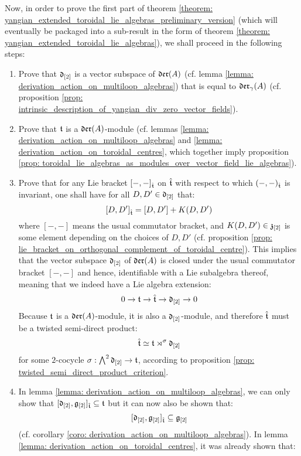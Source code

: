        Now, in order to prove the first part of theorem \ref{theorem: yangian_extended_toroidal_lie_algebras_preliminary_version} (which will eventually be packaged into a sub-result in the form of theorem \ref{theorem: yangian_extended_toroidal_lie_algebras}), we shall proceed in the following steps:
        \begin{enumerate}
            \item Prove that $\mathfrak{d}_{[2]}$ is a vector subspace of $\mathfrak{der}(A)$ (cf. lemma \ref{lemma: derivation_action_on_multiloop_algebras}) that is equal to $\mathfrak{der}_{\gamma}(A)$ (cf. proposition \ref{prop: intrinsic_description_of_yangian_div_zero_vector_fields}).
            \item Prove that $\mathfrak{t}$ is a $\mathfrak{der}(A)$-module (cf. lemmas \ref{lemma: derivation_action_on_multiloop_algebras} and \ref{lemma: derivation_action_on_toroidal_centres}, which together imply proposition \ref{prop: toroidal_lie_algebras_as_modules_over_vector_field_lie_algebras}).
            \item Prove that for any Lie bracket $[-, -]_{\hat{\mathfrak{t}}}$ on $\hat{\mathfrak{t}}$ with respect to which $(-, -)_{\hat{\mathfrak{t}}}$ is invariant, one shall have for all $D, D' \in \mathfrak{d}_{[2]}$ that:
                $$[D, D']_{\hat{\mathfrak{t}}} = [D, D'] + K(D, D')$$
            where $[-, -]$ means the usual commutator bracket, and $K(D, D') \in \mathfrak{z}_{[2]}$ is some element depending on the choices of $D, D'$ (cf. proposition \ref{prop: lie_bracket_on_orthogonal_complement_of_toroidal_centre}). This implies that the vector subspace $\mathfrak{d}_{[2]}$ of $\mathfrak{der}(A)$ is closed under the usual commutator bracket $[-, -]$ and hence, identifiable with a Lie subalgebra thereof, meaning that we indeed have a Lie algebra extension:
                $$0 \to \mathfrak{t} \to \hat{\mathfrak{t}} \to \mathfrak{d}_{[2]} \to 0$$
            Because $\mathfrak{t}$ is a $\mathfrak{der}(A)$-module, it is also a $\mathfrak{d}_{[2]}$-module, and therefore $\hat{\mathfrak{t}}$ must be a twisted semi-direct product:
                $$\hat{\mathfrak{t}} \simeq \mathfrak{t} \rtimes^{\sigma} \mathfrak{d}_{[2]}$$
            for some $2$-cocycle $\sigma: \bigwedge^2 \mathfrak{d}_{[2]} \to \mathfrak{t}$, according to proposition \ref{prop: twisted_semi_direct_product_criterion}.
            \item In lemma \ref{lemma: derivation_action_on_multiloop_algebras}, we can only show that $[\mathfrak{d}_{[2]}, \mathfrak{g}_{[2]}]_{\hat{\mathfrak{t}}} \subseteq \mathfrak{t}$ but it can now also be shown that:
                $$[\mathfrak{d}_{[2]}, \mathfrak{g}_{[2]}]_{\hat{\mathfrak{t}}} \subseteq \mathfrak{g}_{[2]}$$
            (cf. corollary \ref{coro: derivation_action_on_multiloop_algebras}). In lemma \ref{lemma: derivation_action_on_toroidal_centres}, it was already shown that:

\end{enumerate}
